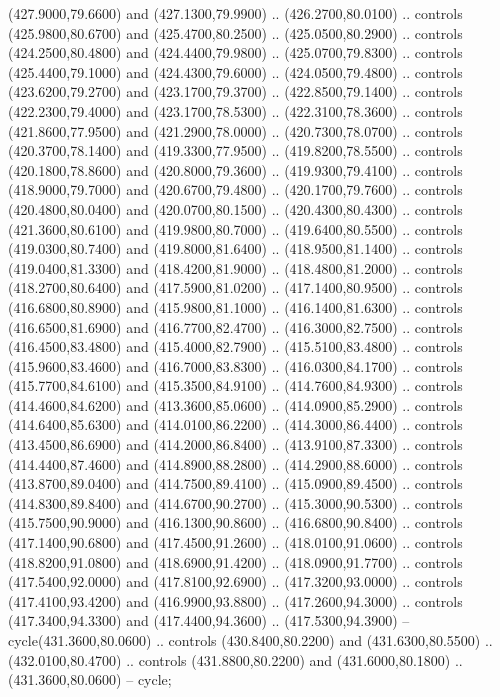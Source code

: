 {\begin{scope}[y=0.80pt, x=0.80pt, yscale=-1, xscale=1, inner sep=0pt, outer sep=0pt, #1]
      (427.9000,79.6600) and (427.1300,79.9900) .. (426.2700,80.0100) .. controls
      (425.9800,80.6700) and (425.4700,80.2500) .. (425.0500,80.2900) .. controls
      (424.2500,80.4800) and (424.4400,79.9800) .. (425.0700,79.8300) .. controls
      (425.4400,79.1000) and (424.4300,79.6000) .. (424.0500,79.4800) .. controls
      (423.6200,79.2700) and (423.1700,79.3700) .. (422.8500,79.1400) .. controls
      (422.2300,79.4000) and (423.1700,78.5300) .. (422.3100,78.3600) .. controls
      (421.8600,77.9500) and (421.2900,78.0000) .. (420.7300,78.0700) .. controls
      (420.3700,78.1400) and (419.3300,77.9500) .. (419.8200,78.5500) .. controls
      (420.1800,78.8600) and (420.8000,79.3600) .. (419.9300,79.4100) .. controls
      (418.9000,79.7000) and (420.6700,79.4800) .. (420.1700,79.7600) .. controls
      (420.4800,80.0400) and (420.0700,80.1500) .. (420.4300,80.4300) .. controls
      (421.3600,80.6100) and (419.9800,80.7000) .. (419.6400,80.5500) .. controls
      (419.0300,80.7400) and (419.8000,81.6400) .. (418.9500,81.1400) .. controls
      (419.0400,81.3300) and (418.4200,81.9000) .. (418.4800,81.2000) .. controls
      (418.2700,80.6400) and (417.5900,81.0200) .. (417.1400,80.9500) .. controls
      (416.6800,80.8900) and (415.9800,81.1000) .. (416.1400,81.6300) .. controls
      (416.6500,81.6900) and (416.7700,82.4700) .. (416.3000,82.7500) .. controls
      (416.4500,83.4800) and (415.4000,82.7900) .. (415.5100,83.4800) .. controls
      (415.9600,83.4600) and (416.7000,83.8300) .. (416.0300,84.1700) .. controls
      (415.7700,84.6100) and (415.3500,84.9100) .. (414.7600,84.9300) .. controls
      (414.4600,84.6200) and (413.3600,85.0600) .. (414.0900,85.2900) .. controls
      (414.6400,85.6300) and (414.0100,86.2200) .. (414.3000,86.4400) .. controls
      (413.4500,86.6900) and (414.2000,86.8400) .. (413.9100,87.3300) .. controls
      (414.4400,87.4600) and (414.8900,88.2800) .. (414.2900,88.6000) .. controls
      (413.8700,89.0400) and (414.7500,89.4100) .. (415.0900,89.4500) .. controls
      (414.8300,89.8400) and (414.6700,90.2700) .. (415.3000,90.5300) .. controls
      (415.7500,90.9000) and (416.1300,90.8600) .. (416.6800,90.8400) .. controls
      (417.1400,90.6800) and (417.4500,91.2600) .. (418.0100,91.0600) .. controls
      (418.8200,91.0800) and (418.6900,91.4200) .. (418.0900,91.7700) .. controls
      (417.5400,92.0000) and (417.8100,92.6900) .. (417.3200,93.0000) .. controls
      (417.4100,93.4200) and (416.9900,93.8800) .. (417.2600,94.3000) .. controls
      (417.3400,94.3300) and (417.4400,94.3600) .. (417.5300,94.3900) --
      cycle(431.3600,80.0600) .. controls (430.8400,80.2200) and (431.6300,80.5500)
      .. (432.0100,80.4700) .. controls (431.8800,80.2200) and (431.6000,80.1800) ..
      (431.3600,80.0600) -- cycle;


\end{scope}}
